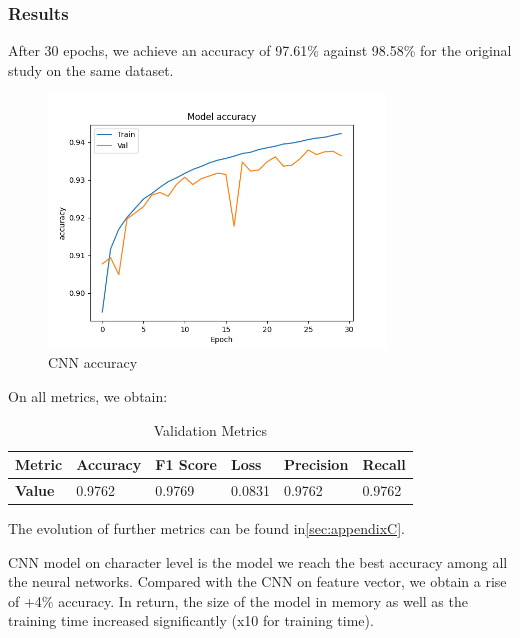 \documentclass{article}
\begin{document}
    \subsubsection{Results}

    After 30 epochs, we achieve an accuracy of 97.61\% against 98.58\% for the original study\cite{CharacterLevelCNN} on the same dataset.
    \begin{figure}[H]
        \centering
        \includegraphics[width=0.8\textwidth]{report_img/nn_results/feature_vector_cnn_26/metric_accuracy}
        \caption{CNN accuracy}
        \label{fig:}
    \end{figure}

    On all metrics, we obtain:
    \begin{table}[H]
        \centering
        \begin{tabular}{|l|l|l|l|l|l|}
            \hline
            \textbf{Metric} & \textbf{Accuracy} & \textbf{F1 Score} & \textbf{Loss} & \textbf{Precision} & \textbf{Recall} \\ \hline
            \textbf{Value}  & 0.9762            & 0.9769            & 0.0831        & 0.9762             & 0.9762          \\ \hline
        \end{tabular}
        \caption{Validation Metrics}
        \label{tab:validation_metrics}
    \end{table}

    The evolution of further metrics can be found in\ref{sec:appendixC}.

    CNN model on character level is the model we reach the best accuracy among all the neural networks.
    Compared with the CNN on feature vector, we obtain a rise of +4\% accuracy.
    In return, the size of the model in memory as well as the training time increased significantly (x10 for training time).
\end{document}
